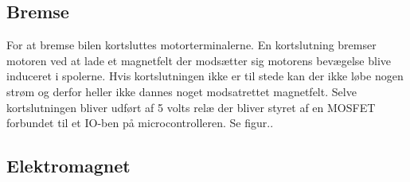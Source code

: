 \subsection{Bremse}

For at bremse bilen kortsluttes motorterminalerne. En kortslutning bremser motoren ved at lade et magnetfelt der modsætter sig motorens bevægelse blive induceret i spolerne. Hvis kortslutningen ikke er til stede kan der ikke løbe nogen strøm og derfor heller ikke dannes noget modsatrettet magnetfelt. Selve kortslutningen bliver udført af 5 volts relæ der bliver styret af en MOSFET forbundet til et IO-ben på microcontrolleren. Se figur.. 

\subsection{Elektromagnet}